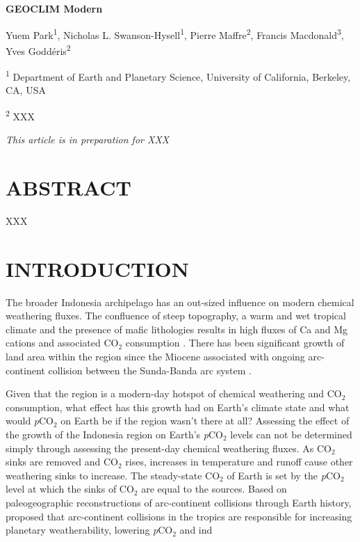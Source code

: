 \documentclass[11pt,letterpaper]{article}
\newcommand{\pCOtwo}{\textit{p}CO$_{2}$\xspace}
\newcommand{\COtwo}{CO$_{2}$\xspace}
\begin{document}
\begin{flushleft}
{\Large \textbf{GEOCLIM Modern}}

Yuem Park\textsuperscript{1},
Nicholas L. Swanson-Hysell\textsuperscript{1},
Pierre Maffre\textsuperscript{2},
Francis Macdonald\textsuperscript{3},
Yves Godd\'eris\textsuperscript{2}

\bigskip
\textsuperscript{1} Department of Earth and Planetary Science, University of California, Berkeley, CA, USA

\textsuperscript{2} XXX
\bigskip

\end{flushleft}

\noindent\textit{This article is in preparation for XXX}

\linenumbers

\section*{ABSTRACT \label{sec:ABSTRACT}}

XXX

\section*{INTRODUCTION \label{sec:INTRODUCTION}}

The broader Indonesia archipelago has an out-sized influence on modern chemical weathering fluxes. The confluence of steep topography, a warm and wet tropical climate and the presence of mafic lithologies results in high fluxes of Ca and Mg cations and associated \COtwo consumption \citep{Hartmann2009a,Hartmann2014a}. There has been significant growth of land area within the region since the Miocene associated with ongoing arc-continent collision between the Sunda-Banda arc system \citep{Molnar2015a}.

Given that the region is a modern-day hotspot of chemical weathering and \COtwo consumption, what effect has this growth had on Earth's climate state and what would \pCOtwo on Earth be if the region wasn't there at all? Assessing the effect of the growth of the Indonesia region on Earth's \pCOtwo levels can not be determined simply through assessing the present-day chemical weathering fluxes. As \COtwo sinks are removed and \COtwo rises, increases in temperature and runoff cause other weathering sinks to increase. The steady-state \COtwo of Earth is set by the \pCOtwo level at which the sinks of \COtwo are equal to the sources. Based on paleogeographic reconstructions of arc-continent collisions through Earth history, \citet{Macdonald2019a} proposed that arc-continent collisions in the tropics are responsible for increasing planetary weatherability, lowering \pCOtwo and ind
\end{document}
